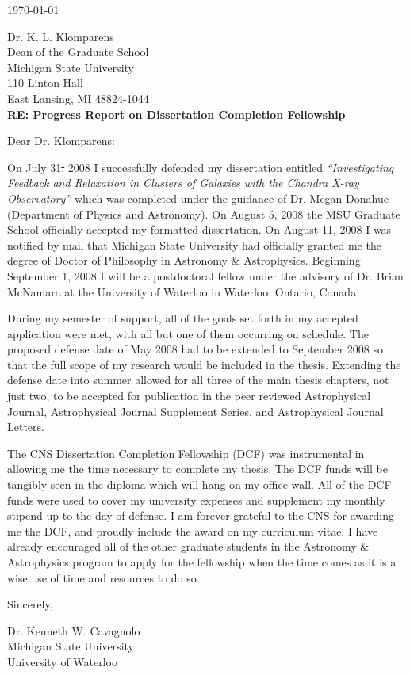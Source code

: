 \documentclass[11pt]{article}
\begin{document}
\today

Dr. K. L. Klomparens\\
Dean of the Graduate School\\
Michigan State University\\
110 Linton Hall\\
East Lansing, MI 48824-1044\\

\large
\textbf{RE: Progress Report on Dissertation Completion Fellowship}
\normalsize

Dear Dr. Klomparens:

On July 31\st, 2008 I successfully defended my dissertation entitled
{\it{``Investigating Feedback and Relaxation in Clusters of Galaxies
    with the Chandra X-ray Observatory''}} which was completed under
the guidance of Dr. Megan Donahue (Department of Physics and
Astronomy). On August 5\ths, 2008 the MSU Graduate School officially
accepted my formatted dissertation. On August 11\ths, 2008 I was
notified by mail that Michigan State University had officially granted
me the degree of Doctor of Philosophy in Astronomy \&
Astrophysics. Beginning September 1\st, 2008 I will be a postdoctoral
fellow under the advisory of Dr. Brian McNamara at the University of
Waterloo in Waterloo, Ontario, Canada.

During my semester of support, all of the goals set forth in my
accepted application were met, with all but one of them occurring on
schedule. The proposed defense date of May 2008 had to be extended to
September 2008 so that the full scope of my research would be included
in the thesis. Extending the defense date into summer allowed for all
three of the main thesis chapters, not just two, to be accepted for
publication in the peer reviewed Astrophysical Journal, Astrophysical
Journal Supplement Series, and Astrophysical Journal Letters.

The CNS Dissertation Completion Fellowship (DCF) was instrumental in
allowing me the time necessary to complete my thesis. The DCF funds
will be tangibly seen in the diploma which will hang on my office
wall. All of the DCF funds were used to cover my university expenses
and supplement my monthly stipend up to the day of defense. I am
forever grateful to the CNS for awarding me the DCF, and proudly
include the award on my curriculum vitae. I have already encouraged
all of the other graduate students in the Astronomy \& Astrophysics
program to apply for the fellowship when the time comes as it is a
wise use of time and resources to do so.

Sincerely,\\
\begin{minipage}{7.5in}
\end{minipage}
Dr. Kenneth W. Cavagnolo\\
Michigan State University\\
University of Waterloo
\end{document}
